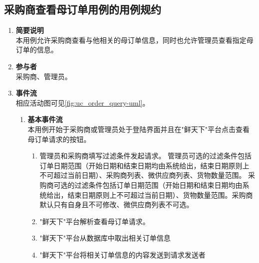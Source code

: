 


\subsection{采购商查看母订单用例的用例规约}

\begin{enumerate}
    \item \textbf{简要说明}  \\ 本用例允许采购商查看与他相关的母订单信息，同时也允许管理员查看指定母订单的信息。
    \item \textbf{参与者} \\ 采购商、管理员。
    \item \textbf{事件流} \\ 相应活动图可见\autoref{fig:uc_order_query-uml}。
    \begin{enumerate} 
        \item \textbf{基本事件流} \\ 本用例开始于采购商或管理员处于登陆界面并且在"鲜天下"平台点击查看母订单请求的按钮。
        \begin{enumerate}
            \item 管理员和采购商填写过滤条件发起请求。
            管理员可选的过滤条件包括订单日期范围（开始日期和结束日期均由系统给出，结束日期原则上不可超过当前日期）、采购商列表、微供应商列表、货物数量范围。
            采购商可选的过滤条件包括订单日期范围（开始日期和结束日期均由系统给出，结束日期原则上不可超过当前日期）、货物数量范围。采购商默认只有自身且不可修改、微供应商列表不可选。

            \item "鲜天下"平台解析查看母订单请求。

            \item "鲜天下"平台从数据库中取出相关订单信息

            \item "鲜天下"平台将相关订单信息的内容发送到请求发送者
            

\end{enumerate}
\end{enumerate}
\end{enumerate}
